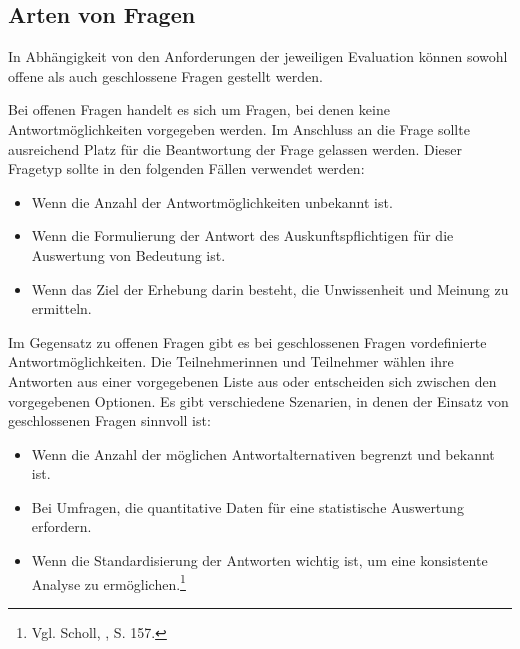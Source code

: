 \subsection{Arten von Fragen}
In Abhängigkeit von den Anforderungen der jeweiligen Evaluation können sowohl offene als auch geschlossene Fragen gestellt werden.

Bei offenen Fragen handelt es sich um Fragen, bei denen keine Antwortmöglichkeiten vorgegeben werden. Im Anschluss an die
Frage sollte ausreichend Platz für die Beantwortung der Frage gelassen werden. Dieser Fragetyp sollte in den folgenden
Fällen verwendet werden:
\begin{itemize}
    \item Wenn die Anzahl der Antwortmöglichkeiten unbekannt ist.
    \item Wenn die Formulierung der Antwort des Auskunftspflichtigen für die Auswertung von Bedeutung ist.
    \item Wenn das Ziel der Erhebung darin besteht, die Unwissenheit und Meinung zu ermitteln.\\
\end{itemize}

Im Gegensatz zu offenen Fragen gibt es bei geschlossenen Fragen vordefinierte Antwortmöglichkeiten. Die Teilnehmerinnen
und Teilnehmer wählen ihre Antworten aus einer vorgegebenen Liste aus oder entscheiden sich zwischen den vorgegebenen
Optionen. Es gibt verschiedene Szenarien, in denen der Einsatz von geschlossenen Fragen sinnvoll ist:

\begin{itemize}
    \item Wenn die Anzahl der möglichen Antwortalternativen begrenzt und bekannt ist.
    \item Bei Umfragen, die quantitative Daten für eine statistische Auswertung erfordern.
    \item Wenn die Standardisierung der Antworten wichtig ist, um eine konsistente Analyse zu ermöglichen.\footnote{Vgl. Scholl, \cite{Die Befragung}, S. 157.}
\end{itemize}

